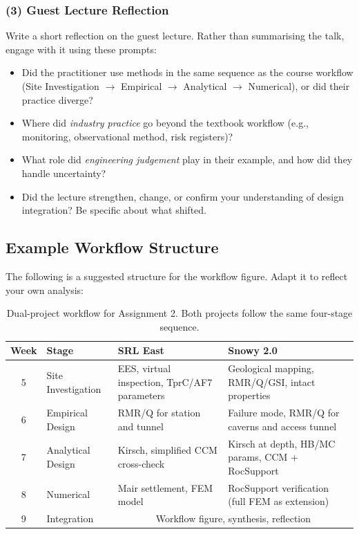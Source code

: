 \documentclass[a4paper,12pt]{article}
\begin{document}
\subsubsection{(3) Guest Lecture Reflection}
Write a short reflection on the guest lecture. Rather than summarising the talk, engage with it using these prompts:
\begin{itemize}
    \item Did the practitioner use methods in the same sequence as the course workflow (Site Investigation $\to$ Empirical $\to$ Analytical $\to$ Numerical), or did their practice diverge?
    \item Where did \textit{industry practice} go beyond the textbook workflow (e.g., monitoring, observational method, risk registers)?
    \item What role did \textit{engineering judgement} play in their example, and how did they handle uncertainty?
    \item Did the lecture strengthen, change, or confirm your understanding of design integration? Be specific about what shifted.
\end{itemize}

\subsection{Example Workflow Structure}

The following is a suggested structure for the workflow figure. Adapt it to reflect your own analysis:

\begin{table}[h!]
\centering
\small
\begin{tabularx}{\textwidth}{c l X X}
\toprule
\textbf{Week} & \textbf{Stage} & \textbf{SRL East} & \textbf{Snowy 2.0} \\
\midrule
5 & Site Investigation & EES, virtual inspection, TprC/AF7 parameters & Geological mapping, RMR/Q/GSI, intact properties \\
6 & Empirical Design & RMR/Q for station and tunnel & Failure mode, RMR/Q for caverns and access tunnel \\
7 & Analytical Design & Kirsch, simplified CCM cross-check & Kirsch at depth, HB/MC params, CCM + RocSupport \\
8 & Numerical & Mair settlement, FEM model & RocSupport verification (full FEM as extension) \\
9 & Integration & \multicolumn{2}{c}{Workflow figure, synthesis, reflection} \\
\bottomrule
\end{tabularx}
\caption{Dual-project workflow for Assignment 2. Both projects follow the same four-stage sequence.}
\end{table}
\end{document}
